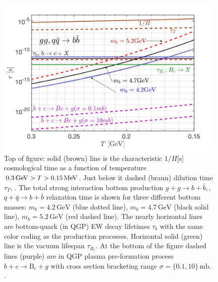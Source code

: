 \begin{figure} 
\centerline{\includegraphics[width=0.9\linewidth]{./plots/BQuarkReactionTime003}}
\caption{{\color{blue}Top of figure: solid (brown) line is the characteristic $1/H$[s] cosmological time as a function of temperature $0.3\,\mathrm{GeV}>T> 0.15\text{\,MeV}$. Just below it dashed (braun) dilution time $\tau_T$, . The total strong interaction bottom production $g+g\to b+\bar{b},$, $q+\bar q\to b+\bar{b}$ relaxation time is shown for three different bottom masses: $m_b=4.2\,\mathrm{GeV}$ (blue dotted line), $m_b=4.7\,\mathrm{GeV}$ (black solid line), $m_b=5.2\,\mathrm{GeV}$ (red dashed line). The nearly horizontal lines are bottom-quark (in QGP) EW decay lifetimes $\tau_b$ with the same color coding as the production processes. Horizontal solid (green) line is the vacuum lifespan $\tau_{B_c}$. At the bottom of the figure dashed lines (purple) are in QGP plasma pre-formation process $b+c\rightarrow \mathrm{B}_c+g$ with cross section bracketing range $\sigma=\{0.1,10\} \,\mathrm{mb}$. .
}}
\label{ReactionTime}
\end{figure}

